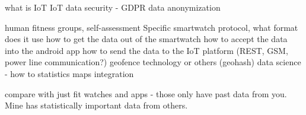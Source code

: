 what is IoT
IoT data security - GDPR
data anonymization

human fitness groups, self-assessment
Specific smartwatch protocol, what format does it use
how to get the data out of the smartwatch
how to accept the data into the android app
how to send the data to the IoT platform (REST, GSM, power line communication?)
geofence technology or others (geohash)
data science - how to statistics
maps integration

compare with just fit watches and apps - those only have past data from you. Mine has statistically important data from others.
